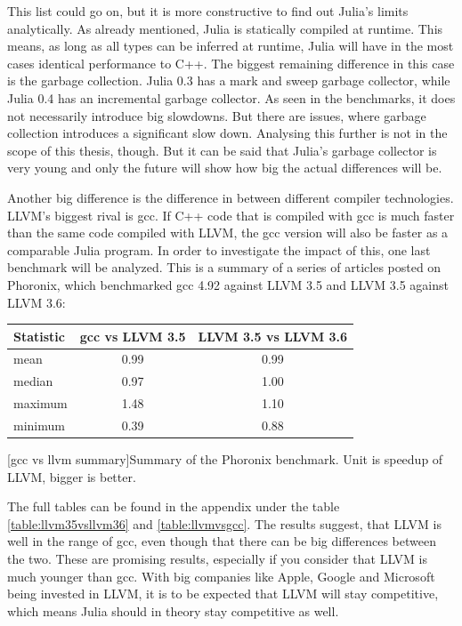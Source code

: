 This list could go on, but it is more constructive to find out Julia's limits analytically.
As already mentioned, Julia is statically compiled at runtime. This means, as long as all types can be inferred at runtime, Julia will have in the most cases identical performance to C++.
The biggest remaining difference in this case is the garbage collection. Julia 0.3 has a mark and sweep garbage collector, while Julia 0.4 has an incremental garbage collector.
As seen in the benchmarks, it does not necessarily introduce big slowdowns.
But there are issues, where garbage collection introduces a significant slow down\cite{ReadDlmGC}.
Analysing this further is not in the scope of this thesis, though. 
But it can be said that Julia's garbage collector is very young and only the future will show how big the actual differences will be.

Another big difference is the difference in between different compiler technologies.
\ac{LLVM}'s biggest rival is \ac{gcc}. If C++ code that is compiled with \ac{gcc} is much faster than the same code compiled with \ac{LLVM}, the \ac{gcc} version will also be faster as a comparable Julia program.
In order to investigate the impact of this, one last benchmark will be analyzed.
This is a summary of a series of articles posted on Phoronix, which benchmarked \ac{gcc} 4.92 against \ac{LLVM} 3.5 and \ac{LLVM} 3.5 against \ac{LLVM} 3.6:
\begin{table}[ht]
  \centering
  \begin{tabular}{l|c|c}
    \hline
    \textbf{Statistic} & \textbf{\ac{gcc} vs \ac{LLVM} 3.5} & \textbf{\ac{LLVM} 3.5 vs \ac{LLVM} 3.6} \\
    \hline
    mean & 0.99 & 0.99 \\
    median & 0.97 & 1.00 \\
    maximum & 1.48 & 1.10 \\
    minimum & 0.39 & 0.88 \\
    \hline
  \end{tabular}
    [gcc vs llvm summary]{Summary of the Phoronix benchmark. Unit is speedup of LLVM, bigger is better. \cite{LLVM35vsLLVM36}\cite{LLVMvsGCC}\cite{Phoronix}}
    \label{table:gccvsllvm}
\end{table}

The full tables can be found in the appendix under the table \ref{table:llvm35vsllvm36} and \ref{table:llvmvsgcc}.
The results suggest, that \ac{LLVM} is well in the range of \ac{gcc}, even though that there can be big differences between the two.
These are promising results, especially if you consider that LLVM is much younger than gcc. 
With big companies like Apple, Google\cite{GoogleAppleLLVM} and Microsoft\cite{MicrosoftLLVM} being invested in LLVM, it is to be expected that \ac{LLVM} will stay competitive, which means Julia should in theory stay competitive as well.



